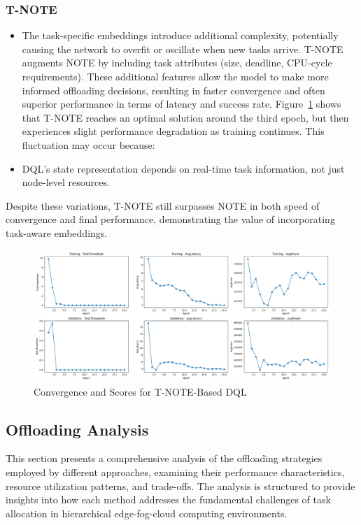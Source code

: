 \documentclass[preprint,3p,authoryear]{elsarticle}
\begin{document}
\subsubsection{T-NOTE}
\begin{itemize}
    \item The task-specific embeddings introduce additional complexity, potentially causing the network to overfit or oscillate when new tasks arrive.
T-NOTE augments NOTE by including task attributes (size, deadline, CPU-cycle requirements). These additional features allow the model to make more informed offloading decisions, resulting in faster convergence and often superior performance in terms of latency and success rate. Figure~\ref{fig:T-NOTE-score-plot} shows that T-NOTE reaches an optimal solution around the third epoch, but then experiences slight performance degradation as training continues. This fluctuation may occur because:
    \item DQL’s state representation depends on real-time task information, not just node-level resources.
\end{itemize}
Despite these variations, T-NOTE still surpasses NOTE in both speed of convergence and final performance, demonstrating the value of incorporating task-aware embeddings.

\begin{figure}[H]
    \centering
    \includegraphics[width=1\linewidth]{figs/T-NOTE/score_plot.png}
    \caption{Convergence and Scores for T-NOTE-Based DQL}
    \label{fig:T-NOTE-score-plot}
\end{figure}



\subsection{Offloading Analysis}\label{subsec:offloading-analysis}

This section presents a comprehensive analysis of the offloading strategies employed by different approaches, examining their performance characteristics, resource utilization patterns, and trade-offs. The analysis is structured to provide insights into how each method addresses the fundamental challenges of task allocation in hierarchical edge-fog-cloud computing environments.
\end{document}
